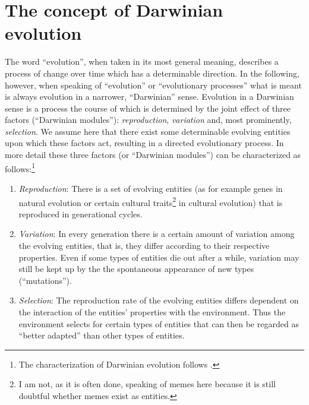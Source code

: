 \section{The concept of Darwinian evolution}

The word ``evolution'', when taken in its most general meaning,
describes a process of change over time which has a determinable
direction. In the following, however, when speaking of ``evolution''
or ``evolutionary processes'' what is meant is always evolution in a
narrower, ``Darwinian'' sense. Evolution in a Darwinian sense is a
process the course of which is determined by the joint effect of three
factors (``Darwinian modules''): {\em reproduction}, {\em variation}
and, most prominently, {\em selection}. We assume here that there
exist some determinable evolving entities upon which these factors
act, resulting in a directed evolutionary process. In more detail
these three factors (or ``Darwinian modules'') can be characterized as
follows:\footnote{The characterization of Darwinian evolution follows
  \cite[p.\  329ff.]{schurz:2001}.}

\begin{enumerate}

\item {\em Reproduction}: There is a set of evolving entities (as for example
  genes in natural evolution or certain cultural traits\footnote{I am not, as
    it is often done, speaking of memes here because it is still doubtful
    whether memes exist as entities.} in cultural evolution) that is
  reproduced in generational cycles.

\item {\em Variation}: In every generation there is a
  certain amount of variation among the evolving entities,
  that is, they differ according to their respective
  properties. Even if some types of entities die out after a
  while, variation may still be kept up by the the
  spontaneous appearance of new types (``mutations'').

\item {\em Selection}: The reproduction rate of the evolving
  entities differs dependent on the interaction of the
  entities' properties with the environment.  Thus the
  environment selects for certain types of entities that can
  then be regarded as ``better adapted'' than other types of
  entities.

\end{enumerate}

